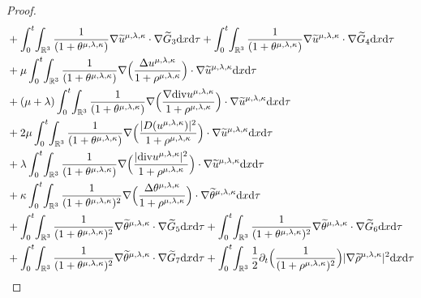 \documentclass[reqno,11pt]{amsart}
\theoremstyle{plain}
\numberwithin{equation}{section}
\begin{document}
\begin{proof}
\begin{align}
&+\int_0^t\!\int_{\mathbb{R}^3}\frac{1}{(1+\theta^{\mu,\lambda,\kappa}) } \nabla\widetilde{u}^{{\mu,\lambda,\kappa}}\cdot\nabla\widetilde{G}_3 {\rm d}x{\rm d}\tau+\int_0^t\!\int_{\mathbb{R}^3} \frac{1}{(1+\theta^{\mu,\lambda,\kappa}) }\nabla\widetilde{u}^{{\mu,\lambda,\kappa}}\cdot\nabla\widetilde{G}_4 {\rm d}x{\rm d}\tau\nonumber\\
&+\mu\int_0^t\!\int_{\mathbb{R}^3}\frac{1}{(1+\theta^{\mu,\lambda,\kappa}) } \nabla\Big(\frac{\Delta u^{\mu,\lambda,\kappa}  }{1+\rho^{\mu,\lambda,\kappa}} \Big)\cdot\nabla\widetilde{u}^{\mu,\lambda,\kappa}{\rm d}x{\rm d}\tau\nonumber\\
&+(\mu+\lambda)\int_0^t\!\int_{\mathbb{R}^3} \frac{1}{(1+\theta^{\mu,\lambda,\kappa}) }\nabla\Big(\frac{\nabla {\rm div} u^{\mu,\lambda,\kappa}  }{1+\rho^{\mu,\lambda,\kappa}} \Big)\cdot\nabla\widetilde{u}^{\mu,\lambda,\kappa}{\rm d}x{\rm d}\tau\nonumber\\
&+2\mu\int_0^t\!\int_{\mathbb{R}^3} \frac{1}{(1+\theta^{\mu,\lambda,\kappa}) }\nabla\Big(\frac{  
|D( u^{\mu,\lambda,\kappa} )|^2 }{1+\rho^{\mu,\lambda,\kappa}} \Big)\cdot\nabla\widetilde{u}^{\mu,\lambda,\kappa}{\rm d}x{\rm d}\tau\nonumber\\
&+\lambda\int_0^t\!\int_{\mathbb{R}^3} \frac{1}{(1+\theta^{\mu,\lambda,\kappa}) }\nabla\Big(\frac{  
|{\rm div} u^{\mu,\lambda,\kappa}  |^2 }{1+\rho^{\mu,\lambda,\kappa}} \Big)\cdot\nabla\widetilde{u}^{\mu,\lambda,\kappa}{\rm d}x{\rm d}\tau \nonumber\\
&+\kappa\int_0^t\!\int_{\mathbb{R}^3}\frac{1}{(1+\theta^{\mu,\lambda,\kappa})^2 } \nabla\Big(\frac{\Delta \theta^{\mu,\lambda,\kappa}  }{1+\rho^{\mu,\lambda,\kappa}} \Big)\cdot\nabla\widetilde{\theta}^{\mu,\lambda,\kappa}{\rm d}x{\rm d}\tau\nonumber\\
&+ \int_0^t\!\int_{\mathbb{R}^3} \frac{1}{(1+\theta^{\mu,\lambda,\kappa})^2 } \nabla\widetilde{\theta}^{{\mu,\lambda,\kappa}} \cdot\nabla\widetilde{G}_5 {\rm d}x{\rm d}\tau+ \int_0^t\!\int_{\mathbb{R}^3} \frac{1}{(1+\theta^{\mu,\lambda,\kappa})^2 } \nabla\widetilde{\theta}^{{\mu,\lambda,\kappa}} \cdot\nabla\widetilde{G}_6 {\rm d}x{\rm d}\tau\nonumber\\
&+ \int_0^t\!\int_{\mathbb{R}^3} \frac{1}{(1+\theta^{\mu,\lambda,\kappa})^2 } \nabla\widetilde{\theta}^{{\mu,\lambda,\kappa}} \cdot\nabla\widetilde{G}_7 {\rm d}x{\rm d}\tau  +\int_0^t\!\int_{\mathbb{R}^3} \frac{1}{2}  \partial_t \Big(\frac{1}{(1+\rho^{\mu,\lambda,\kappa})^2} \Big) |\nabla\widetilde\rho^{\mu,\lambda,\kappa}|^2 {\rm d}x{\rm d}\tau\nonumber\\

\end{align}
\end{proof}
\end{document}
